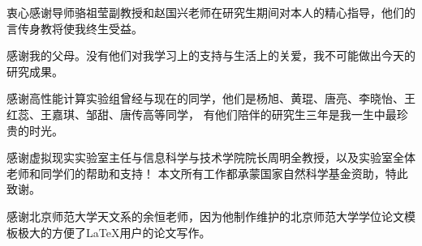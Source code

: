 
\begin{ack}
衷心感谢导师骆祖莹副教授和赵国兴老师在研究生期间对本人的精心指导，他们的言传身教将使我终生受益。

感谢我的父母。没有他们对我学习上的支持与生活上的关爱，我不可能做出今天的研究成果。

感谢高性能计算实验组曾经与现在的同学，他们是杨旭、黄琨、唐亮、李晓怡、王红蕊、王嘉琪、邹甜、唐传高等同学， 有他们陪伴的研究生三年是我一生中最珍贵的时光。

感谢虚拟现实实验室主任与信息科学与技术学院院长周明全教授，以及实验室全体老师和同学们的帮助和支持！ 本文所有工作都承蒙国家自然科学基金资助，特此致谢。

感谢北京师范大学天文系的余恒老师，因为他制作维护的北京师范大学学位论文模板极大的方便了\LaTeX{}用户的论文写作。

\end{ack}
